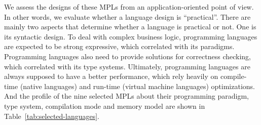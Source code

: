 We assess the designs of these MPLs from an application-oriented point of view.
In other words, we evaluate whether a language design is “practical”.
There are mainly two aspects that determine whether a language is practical or not.
One is its syntactic design.
To deal with complex business logic, programming languages are expected to be strong expressive,
which correlated with its paradigms.
Programming languages also need to provide solutions for correctness checking,
which correlated with its type systems.
Ultimately, programming languages are always supposed to have a better performance,
which rely heavily on compile-time (native languages) and run-time (virtual machine languages) optimizations.
And the profile of the nine selected MPLs about their programming paradigm,
type system, compilation mode and memory model are shown in Table~\ref{tab:selected-languages}.

